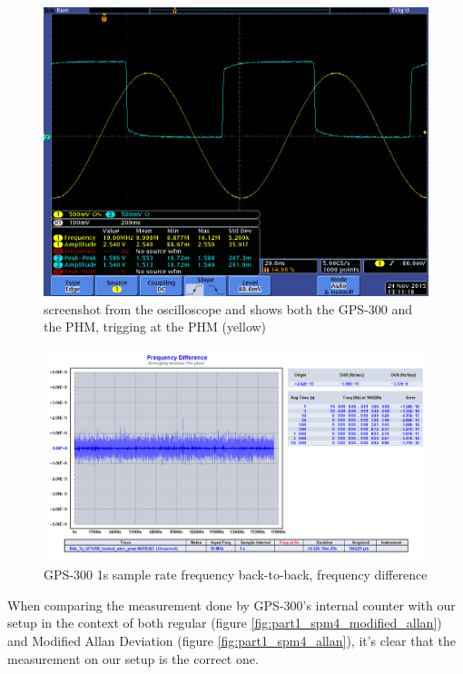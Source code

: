\documentclass[11pt,english,a4paper]{article}
\begin{document}
\begin{figure}[!htb]
  \centering
    \includegraphics[width=1\textwidth]{tek00006.png}
      \caption{screenshot from the oscilloscope and shows both the GPS-300 and the PHM, trigging at the PHM (yellow)}
          \label{fig:tek00006}
\end{figure}

\begin{figure}[!htb]
  \centering
    \includegraphics[width=1\textwidth]{part1_spm5_freq_diff.png}
      \caption{GPS-300 1s sample rate frequency back-to-back, frequency difference}
          \label{fig:part1_spm5_freq_diff}
\end{figure}

\newpage
When comparing the measurement done by GPS-300's internal counter with our setup in the context of both regular (figure \ref{fig:part1_spm4_modified_allan}) and Modified Allan Deviation (figure \ref{fig:part1_spm4_allan}), it's clear that the measurement on our setup is the correct one. 
\end{document}
